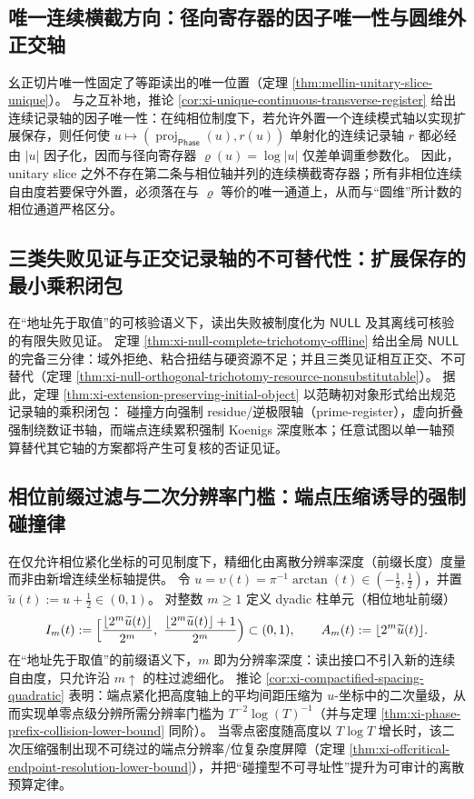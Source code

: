 \subsection{唯一连续横截方向：径向寄存器的因子唯一性与圆维外正交轴}\label{subsec:cdim-unique-continuous-transverse}
幺正切片唯一性固定了等距读出的唯一位置（定理 \ref{thm:mellin-unitary-slice-unique}）。
与之互补地，推论 \ref{cor:xi-unique-continuous-transverse-register} 给出连续记录轴的因子唯一性：在纯相位制度下，若允许外置一个连续模式轴以实现扩展保存，则任何使
\(
u\mapsto(\operatorname{proj}_{\mathsf{Phase}}(u),r(u))
\)
单射化的连续记录轴 \(r\) 都必经由 \(|u|\) 因子化，因而与径向寄存器 \(\varrho(u)=\log|u|\) 仅差单调重参数化。
因此，unitary slice 之外不存在第二条与相位轴并列的连续横截寄存器；所有非相位连续自由度若要保守外置，必须落在与 \(\varrho\) 等价的唯一通道上，从而与“圆维”所计数的相位通道严格区分。

\subsection{三类失败见证与正交记录轴的不可替代性：扩展保存的最小乘积闭包}\label{subsec:cdim-null-trichotomy-record-axes}
在“地址先于取值”的可核验语义下，读出失败被制度化为 \(\mathsf{NULL}\) 及其离线可核验的有限失败见证。
定理 \ref{thm:xi-null-complete-trichotomy-offline} 给出全局 \(\mathsf{NULL}\) 的完备三分律：域外拒绝、粘合扭结与硬资源不足；并且三类见证相互正交、不可替代（定理 \ref{thm:xi-null-orthogonal-trichotomy-resource-nonsubstitutable}）。
据此，定理 \ref{thm:xi-extension-preserving-initial-object} 以范畴初对象形式给出规范记录轴的乘积闭包：
碰撞方向强制 residue/逆极限轴（prime-register），虚向折叠强制绕数证书轴，而端点连续累积强制 Koenigs 深度账本；任意试图以单一轴预算替代其它轴的方案都将产生可复核的否证见证。

\subsection{相位前缀过滤与二次分辨率门槛：端点压缩诱导的强制碰撞律}\label{subsec:cdim-phase-prefix-quadratic-barrier}
在仅允许相位紧化坐标的可见制度下，精细化由离散分辨率深度（前缀长度）度量而非由新增连续坐标轴提供。
令 \(u=\upsilon(t)=\pi^{-1}\arctan(t)\in(-\tfrac12,\tfrac12)\)，并置 \(\widetilde u(t):=u+\tfrac12\in(0,1)\)。
对整数 \(m\ge 1\) 定义 dyadic 柱单元（相位地址前缀）
\[
I_m(t):=\Bigl[\frac{\lfloor 2^m\widetilde u(t)\rfloor}{2^m},\ \frac{\lfloor 2^m\widetilde u(t)\rfloor+1}{2^m}\Bigr)\subset(0,1),
\qquad
A_m(t):=\lfloor 2^m\widetilde u(t)\rfloor.
\]
在“地址先于取值”的前缀语义下，\(m\) 即为分辨率深度：读出接口不引入新的连续自由度，只允许沿 \(m\uparrow\) 的柱过滤细化。
推论 \ref{cor:xi-compactified-spacing-quadratic} 表明：端点紧化把高度轴上的平均间距压缩为 \(u\)-坐标中的二次量级，从而实现单零点级分辨所需分辨率门槛为 \(T^{-2}\log(T)^{-1}\)（并与定理 \ref{thm:xi-phase-prefix-collision-lower-bound} 同阶）。
当零点密度随高度以 \(T\log T\) 增长时，该二次压缩强制出现不可绕过的端点分辨率/位复杂度屏障（定理 \ref{thm:xi-offcritical-endpoint-resolution-lower-bound}），并把“碰撞型不可寻址性”提升为可审计的离散预算定律。


